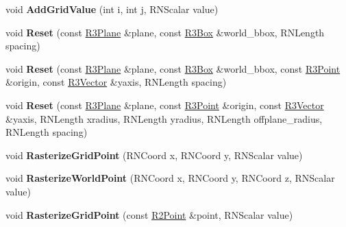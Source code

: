 \begin{DoxyCompactItemize}
\item 
void {\bfseries Add\+Grid\+Value} (int i, int j, R\+N\+Scalar value)\hypertarget{class_r3_planar_grid_a622d0f02fbf88b6a54c37c061ca7bd07}{}\label{class_r3_planar_grid_a622d0f02fbf88b6a54c37c061ca7bd07}

\item 
void {\bfseries Reset} (const \hyperlink{class_r3_plane}{R3\+Plane} \&plane, const \hyperlink{class_r3_box}{R3\+Box} \&world\+\_\+bbox, R\+N\+Length spacing)\hypertarget{class_r3_planar_grid_a6fda1eab61a3ebd3d3e921dbc5099f86}{}\label{class_r3_planar_grid_a6fda1eab61a3ebd3d3e921dbc5099f86}

\item 
void {\bfseries Reset} (const \hyperlink{class_r3_plane}{R3\+Plane} \&plane, const \hyperlink{class_r3_box}{R3\+Box} \&world\+\_\+bbox, const \hyperlink{class_r3_point}{R3\+Point} \&origin, const \hyperlink{class_r3_vector}{R3\+Vector} \&yaxis, R\+N\+Length spacing)\hypertarget{class_r3_planar_grid_ae98f076db0773002df2fc8a3f4205445}{}\label{class_r3_planar_grid_ae98f076db0773002df2fc8a3f4205445}

\item 
void {\bfseries Reset} (const \hyperlink{class_r3_plane}{R3\+Plane} \&plane, const \hyperlink{class_r3_point}{R3\+Point} \&origin, const \hyperlink{class_r3_vector}{R3\+Vector} \&yaxis, R\+N\+Length xradius, R\+N\+Length yradius, R\+N\+Length offplane\+\_\+radius, R\+N\+Length spacing)\hypertarget{class_r3_planar_grid_adedf3cfbf037cd401cf42232996f79f2}{}\label{class_r3_planar_grid_adedf3cfbf037cd401cf42232996f79f2}

\item 
void {\bfseries Rasterize\+Grid\+Point} (R\+N\+Coord x, R\+N\+Coord y, R\+N\+Scalar value)\hypertarget{class_r3_planar_grid_a125891bd35f15394b66fff4ed7e57457}{}\label{class_r3_planar_grid_a125891bd35f15394b66fff4ed7e57457}

\item 
void {\bfseries Rasterize\+World\+Point} (R\+N\+Coord x, R\+N\+Coord y, R\+N\+Coord z, R\+N\+Scalar value)\hypertarget{class_r3_planar_grid_a43cf47e1fa1b16ce8f528eaa1afa3d94}{}\label{class_r3_planar_grid_a43cf47e1fa1b16ce8f528eaa1afa3d94}

\item 
void {\bfseries Rasterize\+Grid\+Point} (const \hyperlink{class_r2_point}{R2\+Point} \&point, R\+N\+Scalar value)\hypertarget{class_r3_planar_grid_afdd4a09732386f15fa5f1bc9d23f4e94}{}\label{class_r3_planar_grid_afdd4a09732386f15fa5f1bc9d23f4e94}


\end{DoxyCompactItemize}
